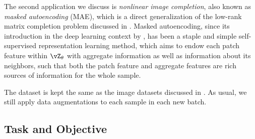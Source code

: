 \documentclass[../../book-main.tex]{subfiles}
\begin{document}
The second application we discuss is \textit{nonlinear image completion}, also known as \textit{masked autoencoding} (MAE), which is a direct generalization of the low-rank matrix completion problem discussed in . Masked autoencoding, since its introduction in the deep learning context by \cite{he2022masked}, has been a staple and simple self-supervised representation learning method, which aims to endow each patch feature within \(\vZ_{\theta}\) with aggregate information as well as information about its neighbors, such that both the patch feature and aggregate features are rich sources of information for the whole sample. 

The dataset is kept the same as the image datasets discussed in . As usual, we still apply data augmentations to each sample in each new batch. 

\subsection{Task and Objective}\label{sub:image_completion_objective}
\end{document}
